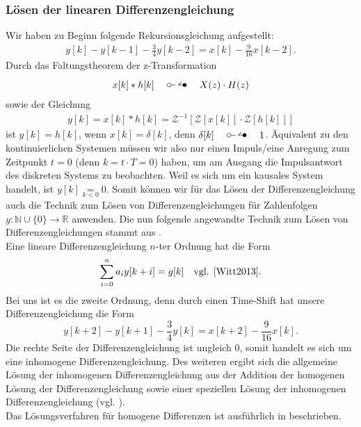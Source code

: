 \documentclass[11pt,a4paper,DIV=12]{scrartcl}
\begin{document}
\subsubsection*{Lösen der linearen Differenzengleichung}
Wir haben zu Beginn folgende Rekursionsgleichung aufgestellt:
%
\begin{gather}
	y[k]-y[k-1]-\frac{3}{4}y[k-2]=x[k]-\frac{9}{16}x[k-2].
\end{gather}
%
Durch das Faltungstheorem der z-Transformation
%
\begin{gather}
	x[k]\ast h[k]\quad\ztransf\quad X(z)\cdot H(z)
\end{gather}
%
sowie der Gleichung
%
\begin{gather}
	y[k]=x[k]\ast h[k]=\mathcal{Z}^{-1}\left[\mathcal{Z}\left[x[k]\right]\cdot\mathcal{Z}\left[h[k]\right]\right]
\end{gather}
%
ist $y[k]=h[k]$, wenn $x[k]=\delta[k]$, denn $\delta[k]\quad\ztransf\quad 1$.
%
Äquivalent zu den kontinuierlichen Systemen müssen wir also nur einen 
Impuls/eine Anregung zum Zeitpunkt $t=0$ (denn $k=t\cdot T=0$) haben, 
um am Ausgang die Impulsantwort des diskreten Systems zu beobachten. 
%
Weil es sich um ein kausales System handelt, ist $y[k]\underset{k<0}{=}0$. 
%
Somit können wir für das Lösen der Differenzengleichung auch die Technik zum 
Lösen von Differenzengleichungen für Zahlenfolgen 
$y:\mathbb{N}\cup\{0\}\rightarrow\mathbb{R}$ anwenden.
%
Die nun folgende angewandte Technik zum Lösen von Differenzengleichungen stammt 
aus \cite[Kap. 5]{Witt2013}.\\
%
Eine lineare Differenzengleichung $n$-ter Ordnung hat die Form
%
\begin{gather}
	\sum_{i=0}^na_iy[k+i]=g[k]\quad \text{vgl. \cite[Kap. 5 S. 80]{Witt2013}}.
\end{gather}
%
Bei uns ist es die zweite Ordnung, denn durch einen Time-Shift hat unsere 
Differenzengleichung die Form 
$$y[k+2]-y[k+1]-\frac{3}{4}y[k]=x[k+2]-\frac{9}{16}x[k].$$
%
Die rechte Seite der Differenzengleichung ist ungleich $0$, 
somit handelt es sich um eine inhomogene Differenzengleichung. 
%
Des weiteren ergibt sich die allgemeine Lösung der inhomogenen 
Differenzengleichung aus der Addition der homogenen Lösung der 
Differenzengleichung sowie einer speziellen Lösung der inhomogenen 
Differenzengleichung (vgl. \cite[Kap. 5 S. 83]{Witt2013}).\\
%
Das Lösungsverfahren für homogene Differenzen ist ausführlich 
in \cite[Kap. 5 S. 84-85]{Witt2013} beschrieben.\\
\end{document}
